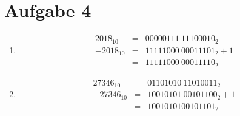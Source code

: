 \documentclass{scrreprt}
\begin{document}
    \section{Aufgabe 4}
    \begin{enumerate}[label = (\alph*)]
        \item 
            \begin{eqnarray*}
                {2018}_{10} &=& {0000 0111\ 1110 0010}_2 \\
                {-2018}_{10} &=& {1111 1000\ 0001 1101}_2 + 1 \\
                &=& {1111 1000\ 0001 1110}_2
            \end{eqnarray*}
        \item
            \begin{eqnarray*}
                {27346}_{10} &=& {0110 1010\ 1101 0011}_2 \\
                {-27346}_{10} &=& {1001 0101\ 0010 1100}_2 + 1\\
                &=& {1001010100101101}_2
            \end{eqnarray*}
    \end{enumerate}
\end{document}
